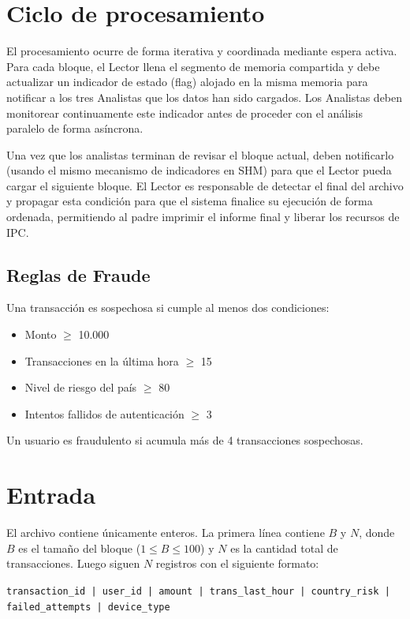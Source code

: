 \documentclass[12pt,a4paper]{article}
\begin{document}
\newpage

\section*{Ciclo de procesamiento}
El procesamiento ocurre de forma iterativa y coordinada mediante espera activa. Para cada bloque, el Lector llena el segmento de memoria compartida y debe actualizar un indicador de estado (flag) alojado en la misma memoria para notificar a los tres Analistas que los datos han sido cargados. Los Analistas deben monitorear continuamente este indicador antes de proceder con el análisis paralelo de forma asíncrona.

\vspace{0.5cm}

Una vez que los analistas terminan de revisar el bloque actual, deben notificarlo (usando el mismo mecanismo de indicadores en SHM) para que el Lector pueda cargar el siguiente bloque. El Lector es responsable de detectar el final del archivo y propagar esta condición para que el sistema finalice su ejecución de forma ordenada, permitiendo al padre imprimir el informe final y liberar los recursos de IPC.

\subsection*{Reglas de Fraude}
Una transacción es sospechosa si cumple al menos dos condiciones:
\begin{itemize}[noitemsep]
    \item Monto $\ge$ 10.000
    \item Transacciones en la última hora $\ge$ 15
    \item Nivel de riesgo del país $\ge$ 80
    \item Intentos fallidos de autenticación $\ge$ 3
\end{itemize}

Un usuario es fraudulento si acumula más de 4 transacciones sospechosas.

\section*{Entrada}
El archivo contiene únicamente enteros. La primera línea contiene $B$ y $N$, donde $B$ es el tamaño del bloque ($1 \le B \le 100$) y $N$ es la cantidad total de transacciones. Luego siguen $N$ registros con el siguiente formato:

\begin{center}
    \texttt{transaction\_id | user\_id | amount | trans\_last\_hour | country\_risk | failed\_attempts | device\_type}
\end{center}
\end{document}
